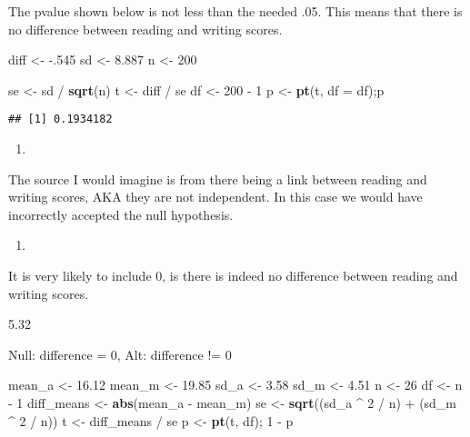 \documentclass[]{article}
\newenvironment{Shaded}{\begin{snugshade}}{\end{snugshade}}
\newcommand{\KeywordTok}[1]{\textcolor[rgb]{0.13,0.29,0.53}{\textbf{{#1}}}}
\newcommand{\DataTypeTok}[1]{\textcolor[rgb]{0.13,0.29,0.53}{{#1}}}
\newcommand{\DecValTok}[1]{\textcolor[rgb]{0.00,0.00,0.81}{{#1}}}
\newcommand{\FloatTok}[1]{\textcolor[rgb]{0.00,0.00,0.81}{{#1}}}
\newcommand{\StringTok}[1]{\textcolor[rgb]{0.31,0.60,0.02}{{#1}}}
\newcommand{\NormalTok}[1]{{#1}}
\begin{document}
The pvalue shown below is not less than the needed .05. This means that
there is no difference between reading and writing scores.

\begin{Shaded}
\begin{Highlighting}[]
\NormalTok{diff <-}\StringTok{ }\NormalTok{-.}\DecValTok{545}
\NormalTok{sd <-}\StringTok{ }\FloatTok{8.887}
\NormalTok{n <-}\StringTok{ }\DecValTok{200}

\NormalTok{se <-}\StringTok{ }\NormalTok{sd /}\StringTok{ }\KeywordTok{sqrt}\NormalTok{(n)}
\NormalTok{t <-}\StringTok{ }\NormalTok{diff /}\StringTok{ }\NormalTok{se}
\NormalTok{df <-}\StringTok{ }\DecValTok{200} \NormalTok{-}\StringTok{ }\DecValTok{1}
\NormalTok{p <-}\StringTok{ }\KeywordTok{pt}\NormalTok{(t, }\DataTypeTok{df =} \NormalTok{df);p}
\end{Highlighting}
\end{Shaded}

\begin{verbatim}
## [1] 0.1934182
\end{verbatim}

\begin{enumerate}
\def\labelenumi{\alph{enumi}.}
\setcounter{enumi}{5}
\item
\end{enumerate}

The source I would imagine is from there being a link between reading
and writing scores, AKA they are not independent. In this case we would
have incorrectly accepted the null hypothesis.

\begin{enumerate}
\def\labelenumi{\alph{enumi}.}
\setcounter{enumi}{6}
\item
\end{enumerate}

It is very likely to include 0, is there is indeed no difference between
reading and writing scores.

5.32

Null: difference = 0, Alt: difference != 0

\begin{Shaded}
\begin{Highlighting}[]
\NormalTok{mean_a <-}\StringTok{ }\FloatTok{16.12}
\NormalTok{mean_m <-}\StringTok{ }\FloatTok{19.85}
\NormalTok{sd_a <-}\StringTok{ }\FloatTok{3.58}
\NormalTok{sd_m <-}\StringTok{ }\FloatTok{4.51}
\NormalTok{n <-}\StringTok{ }\DecValTok{26}
\NormalTok{df <-}\StringTok{ }\NormalTok{n -}\StringTok{ }\DecValTok{1}
\NormalTok{diff_means <-}\StringTok{ }\KeywordTok{abs}\NormalTok{(mean_a -}\StringTok{ }\NormalTok{mean_m)}
\NormalTok{se <-}\StringTok{ }\KeywordTok{sqrt}\NormalTok{((sd_a ^}\StringTok{ }\DecValTok{2} \NormalTok{/}\StringTok{ }\NormalTok{n) +}\StringTok{ }\NormalTok{(sd_m ^}\StringTok{ }\DecValTok{2} \NormalTok{/}\StringTok{ }\NormalTok{n))}
\NormalTok{t <-}\StringTok{ }\NormalTok{diff_means /}\StringTok{ }\NormalTok{se}
\NormalTok{p <-}\StringTok{ }\KeywordTok{pt}\NormalTok{(t, df); }\DecValTok{1} \NormalTok{-}\StringTok{ }\NormalTok{p}
\end{Highlighting}
\end{Shaded}
\end{document}
